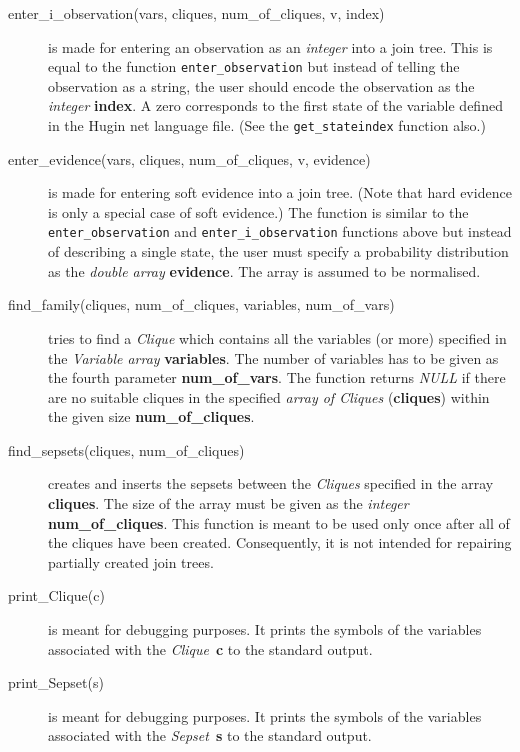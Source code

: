 \documentclass[12pt,a4paper]{report}
\newcommand{\cdatatype}[1]{{\it #1}}
\newcommand{\cparameter}[1]{\textbf{#1}}
\newcommand{\cfunction}[1]{\texttt{#1}}
\begin{document}
\begin{description}
\item[enter\_i\_observation(vars, cliques, num\_of\_cliques, v, index)]
is made for entering an observation as an \cdatatype{integer} into a join
tree. This is equal to the function \cfunction{enter\_observation} but
instead of telling the observation as a string, the user should encode
the observation as the \cdatatype{integer} \cparameter{index}. A zero
corresponds to the first state of the variable defined in the Hugin
net language file. (See the \cfunction{get\_stateindex} function also.)

\item[enter\_evidence(vars, cliques, num\_of\_cliques, v, evidence)]
is made for entering soft evidence into a join tree. (Note that hard
evidence is only a special case of soft evidence.) The function is
similar to the \cfunction{enter\_observation} and
\cfunction{enter\_i\_observation} functions above but instead of
describing a single state, the user must specify a probability
distribution as the \cdatatype{double array} \cparameter{evidence}. 
The array is assumed to be normalised.

\item[find\_family(cliques, num\_of\_cliques, variables, num\_of\_vars)]
tries to find a \cdatatype{Clique} which contains all the variables (or
more) specified in the \cdatatype{Variable array}
\cparameter{variables}. The number of variables has to be given as the 
fourth parameter \cparameter{num\_of\_vars}. The function returns 
\cdatatype{NULL} if there are no suitable cliques in the specified 
\cdatatype{array of Cliques} (\cparameter{cliques}) within the given 
size \cparameter{num\_of\_cliques}.

\item[find\_sepsets(cliques, num\_of\_cliques)] creates and inserts 
the sepsets between the \cdatatype{Cliques} specified in the array 
\cparameter{cliques}. The size of the array must be given as the 
\cdatatype{integer} \cparameter{num\_of\_cliques}. This function is 
meant to be used only once after all of the cliques have been created. 
Consequently, it is not intended for repairing partially created 
join trees.

\item[print\_Clique(c)] is meant for debugging purposes. It prints the
symbols of the variables associated with the
\cdatatype{Clique}~\cparameter{c} to the standard output.

\item[print\_Sepset(s)] is meant for debugging purposes. It prints the
symbols of the variables associated with the
\cdatatype{Sepset}~\cparameter{s} to the standard output.


\end{description}
\end{document}
